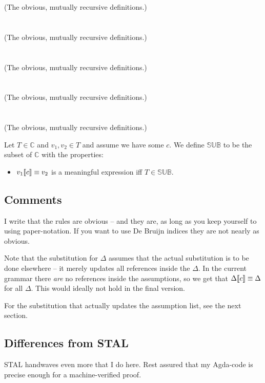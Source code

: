 (The obvious, mutually recursive definitions.)\\\\
\\

(The obvious, mutually recursive definitions.)\\\\
\\

(The obvious, mutually recursive definitions.)\\\\
\\

(The obvious, mutually recursive definitions.)\\\\
\\

(The obvious, mutually recursive definitions.)


\begin{definition}
  Let $T \in \mathbb{C}$ and $v_1, v_2 \in T$ and assume we have some $c$. We define
  $\mathbb{SUB}$ to be the subset of $\mathbb{C}$ with the properties:
  \begin{itemize}
  \item ${v_1} \llbracket {c} \rrbracket \equiv {v_2}$ is a meaningful expression iff $T \in \mathbb{SUB}$.
  \end{itemize}
\end{definition}

\subsection{Comments}

I write that the rules are obvious -- and they are, as long as you keep yourself
to using paper-notation. If you want to use De Bruijn indices they are not
nearly as obvious.

Note that the substitution for $\Delta$ assumes that the actual substitution is
to be done elsewhere -- it merely updates all references inside the $\Delta$. In
the current grammar there \emph{are} no references inside the assumptions, so we
get that ${\Delta} \llbracket {c} \rrbracket \equiv {\Delta}$ for all $\Delta$. This would ideally
not hold in the final version.

For the substitution that actually updates the assumption list, see the next
section.

\subsection{Differences from STAL}

STAL handwaves even more that I do here. Rest assured that my Agda-code is
precise enough for a machine-verified proof.
